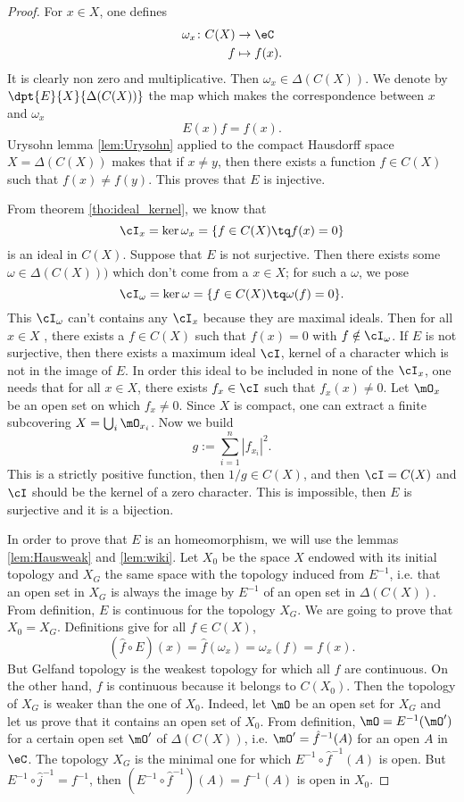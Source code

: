 \begin{proof}
For $x\in X$, one defines 
        \begin{equation}
        \begin{aligned}
            \omega_x \colon C(X) &\to \eC\\
            f&\mapsto f(x).
        \end{aligned}
    \end{equation}  
It is clearly non zero and multiplicative. Then $\omega_x\in\Delta(C(X))$. We denote by $ \dpt{E}{X}{\Delta(C(X))}$ the map which makes the correspondence between $x$ and $\omega_x$
\[ 
  E(x)f=f(x).
\]
Urysohn lemma \ref{lem:Urysohn} applied to the compact Hausdorff space $X=\Delta(C(X))$ makes that if $x\neq y$, then there exists a function $f\in C(X)$ such that $f(x)\neq f(y)$. This proves that $E$ is injective.

From theorem \ref{tho:ideal_kernel}, we know that 
\[ 
\cI_x=\ker\omega_x=\{f\in C(X)\tq f(x)=0\}
\]
is an ideal in $C(X)$. Suppose that $E$ is not surjective. Then there exists some $\omega\in\Delta(C(X)))$ which don't come from a $x\in X$; for such a $\omega$, we pose 
\[ 
\cI_{\omega}=\ker\omega=\{f\in C(X)\tq \omega(f)=0\}.
\]
 This $\cI_{\omega}$ can't contains any $\cI_x$ because they are maximal ideals. Then for all $x\in X$ , there exists a $f\in C(X)$ such that $f(x)=0$ with $f\notin\cI_{\omega}$. If $E$ is not surjective, then there exists a maximum ideal $\cI$, kernel of a character which is not in the image of $E$. In order this ideal to be included in none of the $\cI_x$, one needs that for all $x\in X$, there exists $f_x\in\cI$ such that $f_x(x)\neq 0$. Let $\mO_x$ be an open set on which $f_x\neq 0$. Since $X$ is compact, one can extract a finite subcovering $X=\bigcup_i\mO_{x_i}$. Now we build
\[ 
 g:=\sum_{i=1}^n|f_{x_i}|^2.
\]
This is a strictly positive function, then $1/g\in C(X)$, and then $\cI=C(X)$ and $\cI$ should be the kernel of a zero character. This is impossible, then $E$ is surjective and it is a bijection.

In order to prove that $E$ is an homeomorphism, we will use the lemmas \ref{lem:Hausweak} and \ref{lem:wiki}. Let $X_0$ be the space $X$ endowed with its initial topology and $X_G$ the same space with the topology induced from $E^{-1}$, i.e. that an open set in $X_G$ is always the image by $E^{-1}$ of an open set in $\Delta(C(X))$. From definition, $E$ is continuous for the topology $X_G$. We are going to prove that $X_0=X_G$. Definitions give for all $f\in C(X)$,
\[ 
 (\hat f\circ E)(x)=\hat f(\omega_x)=\omega_x(f)=f(x).
\]
But Gelfand topology is the weakest topology for which all $f$ are continuous. On the other hand, $f$ is continuous because it belongs to $C(X_0)$. Then the topology of $X_G$ is weaker than the one of $X_0$. Indeed, let $\mO$ be an open set for $X_G$ and let us prove that it contains an open set of $X_0$. From definition, $\mO=E^{-1}(\mO')$ for a certain open set $\mO'$ of $\Delta(C(X))$, i.e. $\mO'=\hat f^{-1}(A)$ for an open $A$ in $\eC$. The topology $X_G$ is the minimal one for which $E^{-1}\circ\hat f^{-1}(A)$ is open. But $E^{-1}\circ\hat j^{-1}=f^{-1}$, then $(E^{-1}\circ\hat f^{-1})(A)=f^{-1}(A)$ is open in $X_0$. 
\end{proof}


